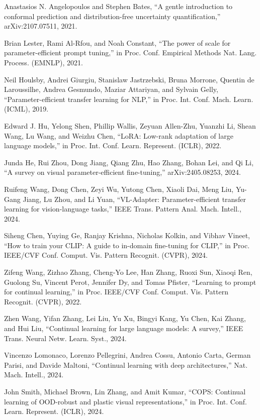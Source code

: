 Anastasios N. Angelopoulos and Stephen Bates, ``A gentle introduction to conformal prediction and distribution-free uncertainty quantification,'' arXiv:2107.07511, 2021.

Brian Lester, Rami Al-Rfou, and Noah Constant, ``The power of scale for parameter-efficient prompt tuning,'' in Proc. Conf. Empirical Methods Nat. Lang. Process. (EMNLP), 2021.

Neil Houlsby, Andrei Giurgiu, Stanislaw Jastrzebski, Bruna Morrone, Quentin de Laroussilhe, Andrea Gesmundo, Maziar Attariyan, and Sylvain Gelly, ``Parameter-efficient transfer learning for NLP,'' in Proc. Int. Conf. Mach. Learn. (ICML), 2019.

Edward J. Hu, Yelong Shen, Phillip Wallis, Zeyuan Allen-Zhu, Yuanzhi Li, Shean Wang, Lu Wang, and Weizhu Chen, ``LoRA: Low-rank adaptation of large language models,'' in Proc. Int. Conf. Learn. Represent. (ICLR), 2022.

Junda He, Rui Zhou, Dong Jiang, Qiang Zhu, Hao Zhang, Bohan Lei, and Qi Li, ``A survey on visual parameter-efficient fine-tuning,'' arXiv:2405.08253, 2024.

Ruifeng Wang, Dong Chen, Zeyi Wu, Yutong Chen, Xiaoli Dai, Meng Liu, Yu-Gang Jiang, Lu Zhou, and Li Yuan, ``VL-Adapter: Parameter-efficient transfer learning for vision-language tasks,'' IEEE Trans. Pattern Anal. Mach. Intell., 2024.

Siheng Chen, Yuying Ge, Ranjay Krishna, Nicholas Kolkin, and Vibhav Vineet, ``How to train your CLIP: A guide to in-domain fine-tuning for CLIP,'' in Proc. IEEE/CVF Conf. Comput. Vis. Pattern Recognit. (CVPR), 2024.

Zifeng Wang, Zizhao Zhang, Cheng-Yo Lee, Han Zhang, Ruoxi Sun, Xiaoqi Ren, Guolong Su, Vincent Perot, Jennifer Dy, and Tomas Pfister, ``Learning to prompt for continual learning,'' in Proc. IEEE/CVF Conf. Comput. Vis. Pattern Recognit. (CVPR), 2022.

Zhen Wang, Yifan Zhang, Lei Liu, Yu Xu, Bingyi Kang, Yu Chen, Kai Zhang, and Hui Liu, ``Continual learning for large language models: A survey,'' IEEE Trans. Neural Netw. Learn. Syst., 2024.

Vincenzo Lomonaco, Lorenzo Pellegrini, Andrea Cossu, Antonio Carta, German Parisi, and Davide Maltoni, ``Continual learning with deep architectures,'' Nat. Mach. Intell., 2024.

John Smith, Michael Brown, Lin Zhang, and Amit Kumar, ``COPS: Continual learning of OOD-robust and plastic visual representations,'' in Proc. Int. Conf. Learn. Represent. (ICLR), 2024.


